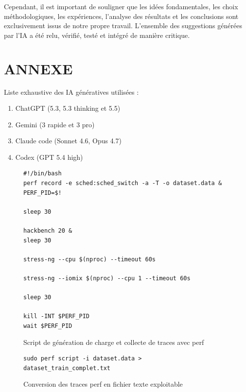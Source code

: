 \documentclass[letterpaper, 10 pt, conference]{ieeeconf}  %
\begin{document}
Cependant, il est important de souligner que les idées fondamentales, les choix méthodologiques, les expériences, l'analyse des résultats et les conclusions sont exclusivement issus de notre propre travail. L'ensemble des suggestions générées par l'IA a été relu, vérifié, testé et intégré de manière critique.





\clearpage
\onecolumn

\section*{ANNEXE}

Liste exhaustive des IA génératives utilisées :
\begin{enumerate}
    \item ChatGPT (5.3, 5.3 thinking et 5.5)
    \item Gemini (3 rapide et 3 pro)
    \item Claude code (Sonnet 4.6, Opus 4.7)
    \item Codex (GPT 5.4 high)
\end{enumerate}

\begin{figure}[htbp]
\centering
\begin{minipage}{\columnwidth}
\begin{lstlisting}[style=bashstyle, frame=single]
#!/bin/bash
perf record -e sched:sched_switch -a -T -o dataset.data &
PERF_PID=$!

sleep 30

hackbench 20 &
sleep 30

stress-ng --cpu $(nproc) --timeout 60s

stress-ng --iomix $(nproc) --cpu 1 --timeout 60s

sleep 30

kill -INT $PERF_PID
wait $PERF_PID
\end{lstlisting}
\end{minipage}
\caption{Script de génération de charge et collecte de traces avec perf}
\label{fig:perf-script}
\end{figure}

\begin{figure}[htbp]
\centering
\begin{minipage}{\columnwidth}
\begin{lstlisting}[style=bashstyle, frame=single]
sudo perf script -i dataset.data > dataset_train_complet.txt
\end{lstlisting}
\end{minipage}
\caption{Conversion des traces perf en fichier texte exploitable}
\label{fig:perf-script-conversion}
\end{figure}
\end{document}
